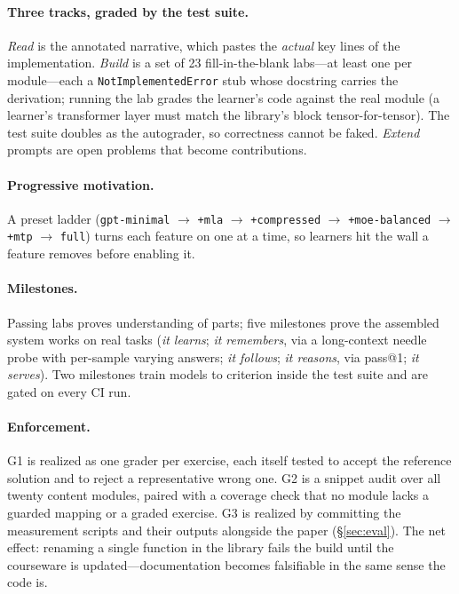 \paragraph{Three tracks, graded by the test suite.}
\emph{Read} is the annotated narrative, which pastes the \emph{actual} key
lines of the implementation. \emph{Build} is a set of 23 fill-in-the-blank
labs---at least one per module---each a \texttt{NotImplementedError} stub
whose docstring carries the derivation; running the lab grades the learner's
code against the real module (a learner's transformer layer must match the
library's block tensor-for-tensor). The test suite doubles as the autograder,
so correctness cannot be faked. \emph{Extend} prompts are open problems that
become contributions.

\paragraph{Progressive motivation.} A preset ladder
(\texttt{gpt-minimal} $\to$ \texttt{+mla} $\to$ \texttt{+compressed} $\to$
\texttt{+moe-balanced} $\to$ \texttt{+mtp} $\to$ \texttt{full}) turns each
feature on one at a time, so learners hit the wall a feature removes before
enabling it.

\paragraph{Milestones.} Passing labs proves understanding of parts; five
milestones prove the assembled system works on real tasks (\emph{it learns};
\emph{it remembers}, via a long-context needle probe with per-sample varying
answers; \emph{it follows}; \emph{it reasons}, via pass@1; \emph{it serves}).
Two milestones train models to criterion inside the test suite and are gated
on every CI run.

\paragraph{Enforcement.} G1 is realized as one grader per exercise, each
itself tested to accept the reference solution and to reject a representative
wrong one. G2 is a snippet audit over all twenty content modules, paired with
a coverage check that no module lacks a guarded mapping or a graded exercise.
G3 is realized by committing the measurement scripts and their outputs
alongside the paper (\S\ref{sec:eval}). The net effect: renaming a single
function in the library fails the build until the courseware is
updated---documentation becomes falsifiable in the same sense the code is.

